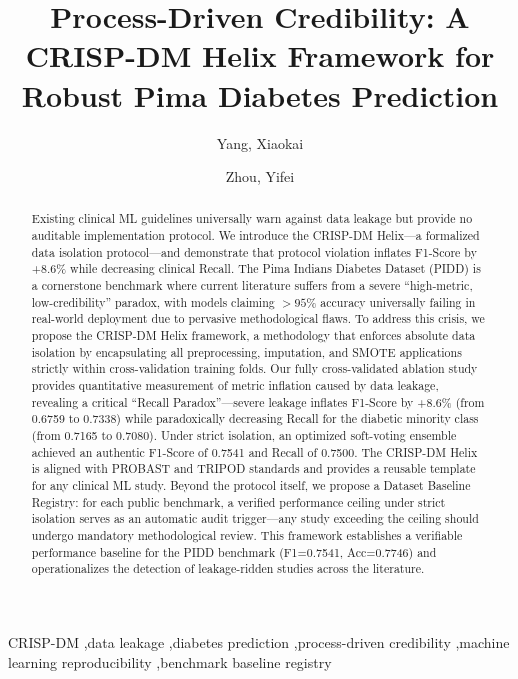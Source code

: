 \documentclass[3p,twocolumn]{elsarticle}
\begin{document}
\begin{frontmatter}

\title{Process-Driven Credibility: A CRISP-DM Helix Framework for Robust Pima Diabetes Prediction}

\author[1]{Yang, Xiaokai}
\author[1,2]{Zhou, Yifei}
\address[1]{Department of Neurology, Wenzhou People's Hospital, Wenzhou, China}
\address[2]{School of Medicine, Shanghai University, Shanghai, China}

\begin{abstract}
Existing clinical ML guidelines universally warn against data leakage but provide no auditable implementation protocol. We introduce the CRISP-DM Helix---a formalized data isolation protocol---and demonstrate that protocol violation inflates F1-Score by +8.6\% while decreasing clinical Recall. The Pima Indians Diabetes Dataset (PIDD) is a cornerstone benchmark where current literature suffers from a severe ``high-metric, low-credibility'' paradox, with models claiming $>95\%$ accuracy universally failing in real-world deployment due to pervasive methodological flaws. To address this crisis, we propose the CRISP-DM Helix framework, a methodology that enforces absolute data isolation by encapsulating all preprocessing, imputation, and SMOTE applications strictly within cross-validation training folds. Our fully cross-validated ablation study provides quantitative measurement of metric inflation caused by data leakage, revealing a critical ``Recall Paradox''---severe leakage inflates F1-Score by +8.6\% (from 0.6759 to 0.7338) while paradoxically decreasing Recall for the diabetic minority class (from 0.7165 to 0.7080). Under strict isolation, an optimized soft-voting ensemble achieved an authentic F1-Score of 0.7541 and Recall of 0.7500. The CRISP-DM Helix is aligned with PROBAST and TRIPOD standards and provides a reusable template for any clinical ML study. Beyond the protocol itself, we propose a Dataset Baseline Registry: for each public benchmark, a verified performance ceiling under strict isolation serves as an automatic audit trigger---any study exceeding the ceiling should undergo mandatory methodological review. This framework establishes a verifiable performance baseline for the PIDD benchmark (F1=0.7541, Acc=0.7746) and operationalizes the detection of leakage-ridden studies across the literature.
\end{abstract}

\begin{keyword}
CRISP-DM \sep data leakage \sep diabetes prediction \sep process-driven credibility \sep machine learning reproducibility \sep benchmark baseline registry
\end{keyword}

\end{frontmatter}
\end{document}
